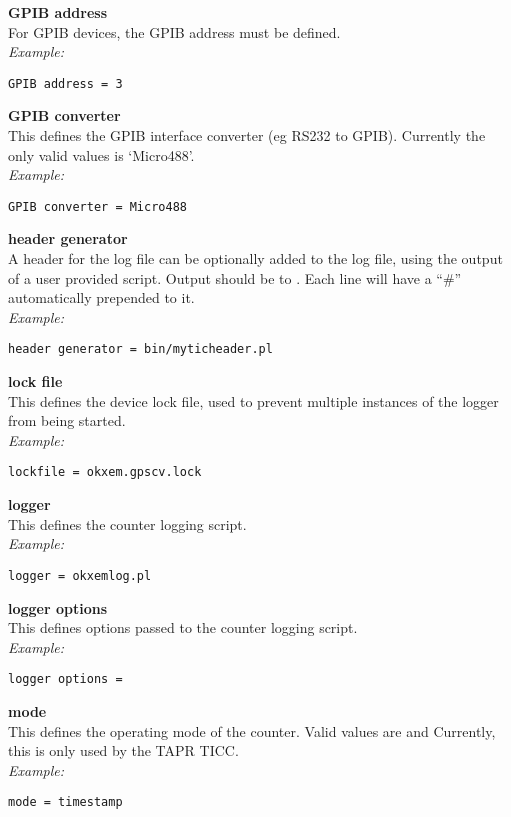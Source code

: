 {\bfseries GPIB address}\\ \hypertarget{h:counter_gpib_address}{}
For GPIB devices, the GPIB address must be defined.\\
\textit{Example:}
\begin{lstlisting}
GPIB address = 3
\end{lstlisting}

{\bfseries GPIB converter}\\  \hypertarget{h:counter_gpib_converter}{}
This defines the GPIB interface converter (eg RS232 to GPIB).
Currently the only valid values is `Micro488'.\\
\textit{Example:}
\begin{lstlisting}
GPIB converter = Micro488
\end{lstlisting}

{\bfseries header generator}\\
A header for the log file can be optionally added to the log file, using the output
of a user provided script. Output should be to .
Each line will have a ``\#'' automatically prepended to it.\\
\textit{Example:}
\begin{lstlisting}
header generator = bin/myticheader.pl
\end{lstlisting}

{\bfseries lock file}\\
This defines the device lock file, used to prevent multiple instances of the logger
from being started.\\
\textit{Example:}
\begin{lstlisting}
lockfile = okxem.gpscv.lock
\end{lstlisting}

{\bfseries logger}\\
This defines the counter logging script.\\
\textit{Example:}
\begin{lstlisting}
logger = okxemlog.pl
\end{lstlisting}

{\bfseries logger options}\\
This defines options passed to the counter logging script.\\
\textit{Example:}
\begin{lstlisting}
logger options =
\end{lstlisting}

{\bfseries mode}\\ \hypertarget{h:counter_mode}{}
This defines the operating mode of the counter.
Valid values are  and 
Currently, this is only used by the TAPR TICC.\\
\textit{Example:}
\begin{lstlisting}
mode = timestamp
\end{lstlisting}

